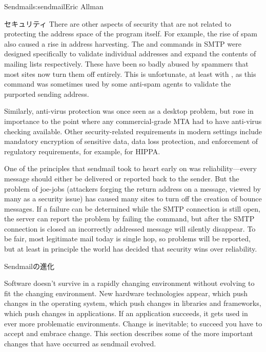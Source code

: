 \begin{aosachapter}{Sendmail}{s:sendmail}{Eric Allman}
\begin{aosasect1}{セキュリティ}
There are other aspects of security that are not related to protecting
the address space of the program itself. For example, the rise of spam
also caused a rise in address harvesting. The  and  commands
in SMTP were designed specifically to validate individual addresses
and expand the contents of mailing lists respectively. These have been
so badly abused by spammers that most sites now turn them off
entirely. This is unfortunate, at least with , as this command was
sometimes used by some anti-spam agents to validate the purported
sending address.

Similarly, anti-virus protection was once seen as a desktop problem,
but rose in importance to the point where any commercial-grade MTA had
to have anti-virus checking available.
Other security-related requirements in modern settings
include mandatory encryption of sensitive data,
data loss protection,
and enforcement of regulatory requirements,
for example, for HIPPA.

One of the principles that sendmail took to heart early on was
reliability---every message should either be delivered or reported
back to the sender. But the problem of joe-jobs (attackers forging
the return address on a message, viewed by many as a security issue)
has caused many sites to turn off the
creation of bounce messages. If a failure can be determined while
the SMTP connection is still open, the server can report the problem
by failing the command, but after the SMTP connection is closed an
incorrectly addressed message will silently disappear. To be fair,
most legitimate mail today is single hop, so problems will be
reported, but at least in principle the world has decided that
security wins over reliability.

\end{aosasect1}

\begin{aosasect1}{Sendmailの進化}
\label{sec.sendmail.evo}

Software doesn't survive in a rapidly changing environment without
evolving to fit the changing environment. New hardware technologies
appear, which push changes in the operating system, which push changes
in libraries and frameworks, which push changes in applications. If an
application succeeds, it gets used in ever more problematic
environments.  Change is inevitable; to succeed you have to accept and
embrace change.  This section describes some of the more important
changes that have occurred as sendmail evolved.


\end{aosasect1}
\end{aosachapter}
